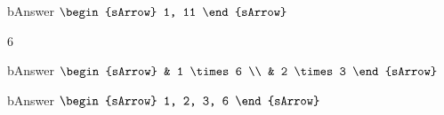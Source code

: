 \begin{mtask}[resume]
\begin{tcbraster}
\begin{tcolorbox}[raster multicolumn=4]
    \end{tcolorbox}
    \begin{tcolorbox}[raster multicolumn=3]
	    \begin{envCell}{bAnswer}
			 $\begin{sArrow}
 			          1, 11           
				  \end{sArrow}$	
	    \end{envCell}
    \end{tcolorbox}
	\begin{tcolorbox}6\end{tcolorbox}
	\begin{tcolorbox}[raster multicolumn=4]
	    \begin{envCell}{bAnswer}
			 $\begin{sArrow}
                      & 1  \times 6 \\
                      & 2  \times 3 
				  \end{sArrow}$	
	    \end{envCell}
    \end{tcolorbox}
    \begin{tcolorbox}[raster multicolumn=3]
	    \begin{envCell}{bAnswer}
			 $\begin{sArrow}
 			          1, 2, 3, 6           
				  \end{sArrow}$	
	    \end{envCell}
    \end{tcolorbox}
\end{tcbraster}
\end{mtask}

